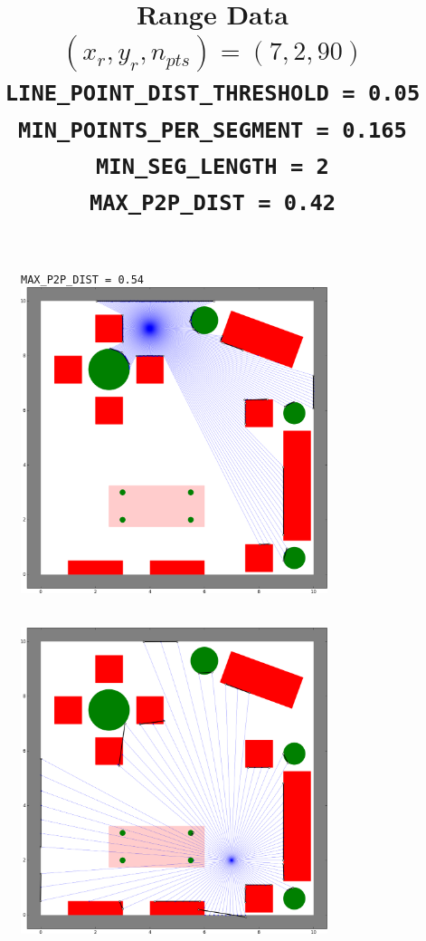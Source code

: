 \documentclass[12pt]{article}
\begin{document}
\begin{enumerate}
\begin{figure}[H]
{			\verb|MAX_P2P_DIST = 0.54|}
		\\ \vspace{5mm}
		\includegraphics[width=0.8\textwidth]{../Figures/hw2_2_ii_49360.png}
	\end{figure}
	\begin{figure}[H]
		\centering
		\title{\bf Range Data $(x_r, y_r, n_{pts}) = (7,2,90)$ \\ \vspace{2.5mm}
			\verb|LINE_POINT_DIST_THRESHOLD = 0.05| \\
			\verb|MIN_POINTS_PER_SEGMENT = 0.165| \\
			\verb|MIN_SEG_LENGTH = 2| \\
			\verb|MAX_P2P_DIST = 0.42|}
		\\ \vspace{5mm}
		\includegraphics[width=0.8\textwidth]{../Figures/hw2_2_ii_7290.png}
	\end{figure}
\end{enumerate}
\end{document}
